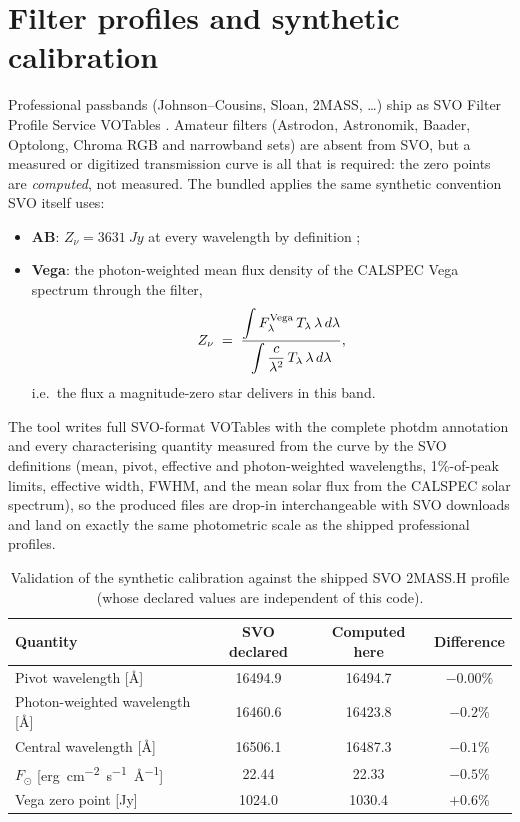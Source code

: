 \section{Filter profiles and synthetic calibration}
\label{sec:filters}

Professional passbands (Johnson--Cousins, Sloan, 2MASS, \dots) ship as SVO
Filter Profile Service VOTables \citep{rodrigo2020}. Amateur filters
(Astrodon, Astronomik, Baader, Optolong, Chroma RGB and narrowband sets)
are absent from SVO, but a measured or digitized transmission curve is all
that is required: the zero points are \emph{computed}, not measured. The
bundled  applies the same synthetic
convention SVO itself uses:
\begin{itemize}
\item \textbf{AB}: $Z_\nu = \SI{3631}{Jy}$ at every wavelength by
  definition \citep{oke1983};
\item \textbf{Vega}: the photon-weighted mean flux density of the CALSPEC
  Vega spectrum \citep{bohlin2014} through the filter,
  \begin{equation}
    Z_\nu \;=\; \frac{\displaystyle\int F_\lambda^{\rm Vega}\,
    T_\lambda\,\lambda\,d\lambda}
    {\displaystyle\int \frac{c}{\lambda^2}\,T_\lambda\,\lambda\,d\lambda},
  \end{equation}
  i.e.\ the flux a magnitude-zero star delivers in this band.
\end{itemize}
The tool writes full SVO-format VOTables with the complete photdm
annotation and every characterising quantity measured from the curve by
the SVO definitions (mean, pivot, effective and photon-weighted
wavelengths, 1\%-of-peak limits, effective width, FWHM, and the mean solar
flux  from the CALSPEC solar spectrum), so the produced files
are drop-in interchangeable with SVO downloads and land on exactly the
same photometric scale as the shipped professional profiles.

\begin{table}
\centering
\caption{Validation of the synthetic calibration against the shipped SVO
2MASS.H profile (whose declared values are independent of this code).}
\label{tab:filtercal}
\begin{tabular}{lccc}
\toprule
Quantity & SVO declared & Computed here & Difference \\
\midrule
Pivot wavelength [\si{\angstrom}] & 16494.9 & 16494.7 & $-0.00\%$ \\
Photon-weighted wavelength [\si{\angstrom}] & 16460.6 & 16423.8 & $-0.2\%$ \\
Central wavelength [\si{\angstrom}] & 16506.1 & 16487.3 & $-0.1\%$ \\
$F_\odot$ [\si{erg.cm^{-2}.s^{-1}.\angstrom^{-1}}] & 22.44 & 22.33 & $-0.5\%$ \\
Vega zero point [Jy] & 1024.0 & 1030.4 & $+0.6\%$ \\
\bottomrule
\end{tabular}
\end{table}

